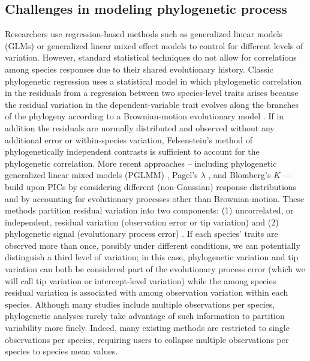 \documentclass[12pt]{article}
\begin{document}
\subsection*{Challenges in modeling phylogenetic process}

Researchers use regression-based methods such as generalized linear models (GLMs) or generalized linear mixed effect models \citep[GLMMs:][]{bolker2009generalized} to control for different levels of variation.
However, standard statistical techniques do not allow for correlations among species responses due to their shared evolutionary history.
Classic phylogenetic regression uses a statistical model in which phylogenetic correlation in the residuals from a regression between two species-level traits arises because the residual variation in the dependent-variable trait evolves along the branches of the phylogeny according to a Brownian-motion evolutionary model \citep{felsenstein1985phylogenies}. 
If in addition the residuals are normally distributed and observed without any additional error or within-species variation, Felsenstein's method of phylogenetically independent contrasts  \citep[PICS:][]{felsenstein1985phylogenies, nicolakakis2000forebrain} is sufficient to account for the phylogenetic correlation.
More recent approaches -- including phylogenetic generalized linear mixed models (PGLMM) \citep{ives2011generalized, housworth2004phylogenetic}, Pagel's $\lambda$ \citep{pagel1999inferring}, and Blomberg's $K$ \citep{blomberg2003testing} --- build upon PICs by considering different (non-Gaussian) response distributions and by accounting for evolutionary processes other than Brownian-motion. 
These methods partition residual variation into two components: (1) uncorrelated, or independent, residual variation (observation error or tip variation) and (2) phylogenetic signal (evolutionary process error) \citep{hansen2012interpreting, housworth2004phylogenetic}.
If each species' traits are observed more than once, possibly under different conditions, we can potentially distinguish a third level of variation; in this case, phylogenetic variation and tip variation can both be considered part of the evolutionary process error (which we will call tip variation or intercept-level variation) while the among species residual variation is associated with among observation variation within each species.
Although many studies include multiple observations per species, phylogenetic analyses rarely take advantage of such information to partition variability more finely.
Indeed, many existing methods are restricted to single observations per species, requiring users to collapse multiple observations per species to species mean values.
\end{document}
